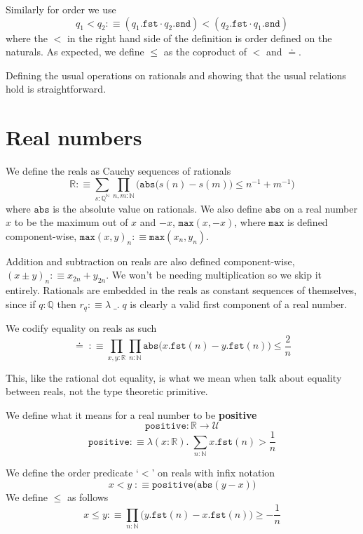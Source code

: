 \documentclass[12pt]{report}
\newtheorem{prop}[thm]{Proposition}
\theoremstyle{definition}
\begin{document}
Similarly for order we use 
$$q_1 < q_2 :\equiv (q_1.\mathtt{fst} \cdot q_2.\mathtt{snd}) < (q_2.\mathtt{fst} \cdot q_1.\mathtt{snd})$$ 
where the $<$ in the right hand side of the definition is order defined on the naturals. 
As expected, we define $\leq$ as the coproduct of $<$ and $\doteq$. 

Defining the usual operations on rationals and showing that the usual relations hold is straightforward. 

\section{Real numbers}
We define the reals as Cauchy sequences of rationals
$$\mathbb{R} :\equiv \sum_{s: \mathbb{Q}^\mathbb{N}}\prod_{n,m : \mathbb{N}} \Big( \mathtt{abs}\big(s(n) - s(m) \big) \leq n^{-1} + m^{-1} \Big)$$
where $\mathtt{abs}$ is the absolute value on rationals. 
We also define $\mathtt{abs}$ on a real number $x$ to be the maximum out of $x$ and $-x$, $\mathtt{max}(x,-x)$, where $\mathtt{max}$ is defined component-wise, $\mathtt{max}(x,y)_n :\equiv \mathtt{max}(x_n,y_n)$. 

Addition and subtraction on reals are also defined component-wise, $(x \pm y)_n :\equiv x_{2n} + y_{2n}$. 
We won't be needing multiplication so we skip it entirely. 
Rationals are embedded in the reals as constant sequences of themselves, since if $q : \mathbb{Q}$ then $r_q :\equiv \lambda\;\_.\; q$ is clearly a valid first component of a real number. 

We codify equality on reals as such
$$\doteq\;:\equiv \prod_{x,y : \mathbb{R}} \prod_{n : \mathbb{N}} \mathtt{abs}\big( x.\mathtt{fst}(n) - y.\mathtt{fst}(n)\big) \leq \frac{2}{n}$$

This, like the rational dot equality, is what we mean when talk about equality between reals, not the type theoretic primitive. 

We define what it means for a real number to be \textbf{positive}
$$\mathtt{positive}  :\mathbb{R} \rightarrow \mathcal{U}$$
$$\mathtt{positive} :\equiv \lambda(x: \mathbb{R}).\; \sum_{n : \mathbb{N}} x.\mathtt{fst}(n) > \frac{1}{n}$$

We define the order predicate `$<$' on reals with infix notation
$$x<y\; :\equiv \mathtt{positive}\big( \mathtt{abs}(y-x) \big)$$
We define $\leq$ as follows
$$x \leq y :\equiv \prod_{n : \mathbb{N}} \big( y.\mathtt{fst}(n) - x.\mathtt{fst}(n) \big) \geq -\frac{1}{n}$$
\end{document}
